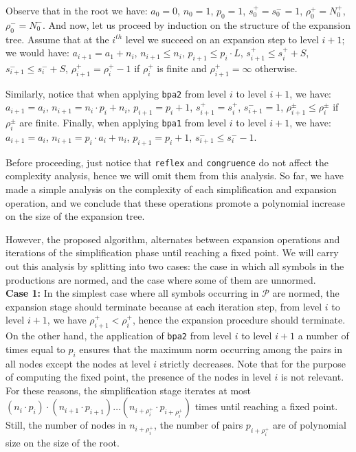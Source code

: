 Observe that in the root we have: $a_0=0$, $n_0=1$, $p_0=1$,
$s_0^+=s_0^-=1$, $\rho_0^+=N_0^+$, $\rho_0^-=N_0^-$. And now, let us proceed
by induction on the structure of the expansion tree. Assume 
that at the $i^{th}$ level we succeed on an expansion step to
level $i+1$;
we would have: $a_{i+1}=a_1+n_i$, $n_{i+1}\leq n_i$, 
$p_{i+1}\leq p_i\cdot L$,
$s_{i+1}^+\leq s_i^++S$, $s_{i+1}^-\leq s_i^-+S$, $\rho_{i+1}^+=\rho_i^+-1$ 
if $\rho_i^+$ is finite and  $\rho_{i+1}^+ = \infty$ otherwise.

Similarly, notice that when applying \lstinline{bpa2} from level $i$
to level $i+1$, we have: $a_{i+1}=a_i$, $n_{i+1} = n_i\cdot p_i + n_i$,
$p_{i+1}=p_i+1$, $s_{i+1}^+=s_i^+$, $s_{i+1}^-=1$, 
$\rho_{i+1}^\pm\leq \rho_i^\pm$ if $\rho_i^\pm$ are finite. 
Finally, when applying \lstinline{bpa1} from level $i$
to level $i+1$, we have: $a_{i+1}=a_i$, $n_{i+1} = p_i \cdot a_i+n_i$,
$p_{i+1}=p_i+1$, $s_{i+1}^- \leq s_i^- - 1$.

Before proceeding, just notice that \lstinline{reflex} and 
\lstinline{congruence} do not affect the complexity analysis, hence 
we will omit them from this analysis.
So far, we have made a simple analysis on the complexity of each 
simplification and expansion operation, and we conclude that
these operations promote a polynomial increase on the size of the
expansion tree. 

However, the proposed algorithm, alternates between expansion 
operations and iterations of the simplification phase until 
reaching a fixed point. We will carry out this analysis by 
splitting into two cases: the case in which all symbols 
in the productions are normed, and the case where some
of them are unnormed.\\

\noindent\textbf{Case 1:} In the simplest case where all symbols
occurring in $\mathcal{P}$ are normed, the expansion stage should 
terminate because at each iteration step, from level $i$ to level
$i+1$, we have $\rho_{i+1}^+ < \rho_i^+$, hence the expansion procedure 
should terminate.
On the other hand, the application of \lstinline{bpa2} from 
level $i$ to level $i+1$ a number of times equal to $p_i$
ensures that the maximum norm occurring among the pairs in
all nodes except the nodes at level $i$ strictly decreases.
Note that for the purpose of computing the fixed point, the
presence of the nodes in level $i$ is not relevant.
For these reasons, the simplification stage iterates at most 
$(n_i\cdot p_i)\cdot (n_{i+1}\cdot p_{i+1})\ldots (n_{i+\rho_i^+}\cdot
p_{i+\rho_i^+})$ times until reaching a fixed point. 
Still, the number of nodes in $n_{i+\rho_i^+}$, 
the number of pairs $p_{i+\rho_i^+}$ are of polynomial size on the 
size of the root.\\

